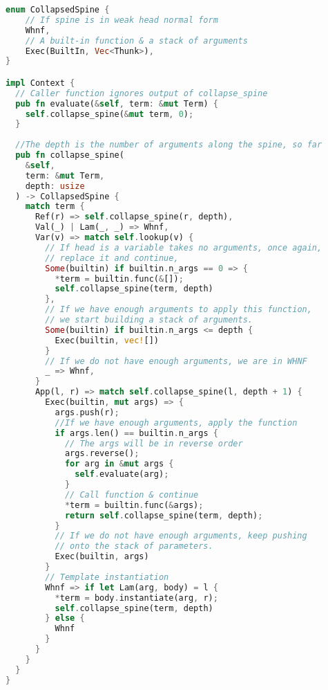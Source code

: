 \begin{lstlisting}[language=rust]
enum CollapsedSpine {
    // If spine is in weak head normal form
    Whnf,
    // A built-in function & a stack of arguments
    Exec(BuiltIn, Vec<Thunk>),
}

impl Context {
  // Caller function ignores output of collapse_spine
  pub fn evaluate(&self, term: &mut Term) {
    self.collapse_spine(&mut term, 0);
  }
  
  //The depth is the number of arguments along the spine, so far 
  pub fn collapse_spine(
    &self,
    term: &mut Term,
    depth: usize
  ) -> CollapsedSpine {
    match term {
      Ref(r) => self.collapse_spine(r, depth),
      Val(_) | Lam(_, _) => Whnf,
      Var(v) => match self.lookup(v) {
        // If head is a variable takes no arguments, once again,
        // replace it and continue,
        Some(builtin) if builtin.n_args == 0 => {
          *term = builtin.func(&[]);
          self.collapse_spine(term, depth)
        },
        // If we have enough arguments to apply this function,
        // we start building a stack of arguments.
        Some(builtin) if builtin.n_args <= depth {
          Exec(builtin, vec![])
        }
        // If we do not have enough arguments, we are in WHNF
        _ => Whnf,
      }
      App(l, r) => match self.collapse_spine(l, depth + 1) {
        Exec(builtin, mut args) => {
          args.push(r);
          //If we have enough arguments, apply the function 
          if args.len() == builtin.n_args {
            // The args will be in reverse order
            args.reverse();
            for arg in &mut args {
              self.evaluate(arg);
            }
            // Call function & continue
            *term = builtin.func(&args);
            return self.collapse_spine(term, depth);
          }
          // If we do not have enough arguments, keep pushing
          // onto the stack of parameters.
          Exec(builtin, args)
        } 
        // Template instantiation
        Whnf => if let Lam(arg, body) = l {
          *term = body.instantiate(arg, r);
          self.collapse_spine(term, depth)
        } else {
          Whnf
        }
      }
    }
  } 
}
\end{lstlisting}
